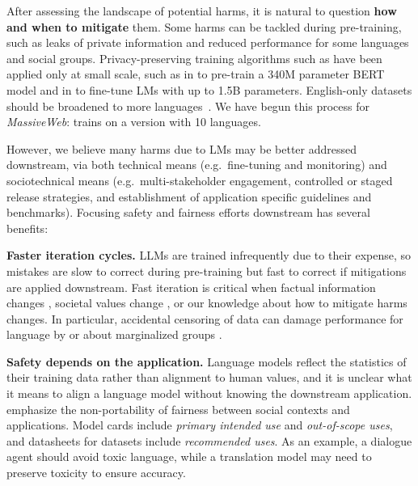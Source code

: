 \documentclass[11pt, a4paper, logo, internal, copyright, nonumbering]{deepmind}
\newcommand{\massiveweb}{\textit{MassiveWeb}\xspace}
\begin{document}
After assessing the landscape of potential harms, it is natural to question \textbf{how and when to mitigate} them. Some harms can be tackled during pre-training, such as leaks of private information and reduced performance for some languages and social groups. Privacy-preserving training algorithms such as \citet{abadi2016deep} have been applied only at small scale, such as in \cite{anil2021large} to pre-train a 340M parameter BERT model and in \citet{yu2021differentially} to fine-tune LMs with up to 1.5B parameters.
English-only datasets should be broadened to more languages~\citep{xue2020mt5}. We have begun this process for \massiveweb: \cite{borgeaud2021retrieval} trains on a version with 10 languages.

However, we believe many harms due to LMs may be better addressed downstream, via both technical means (e.g.\ fine-tuning and monitoring) and sociotechnical means (e.g.\ multi-stakeholder engagement, controlled or staged release strategies, and establishment of application specific guidelines and benchmarks).
Focusing safety and fairness efforts downstream has several benefits:

\textbf{Faster iteration cycles.} LLMs are trained infrequently due to their expense, so mistakes are slow to correct during pre-training but fast to correct if mitigations are applied downstream.  Fast iteration is critical when factual information changes \citep{lazaridou2021pitfalls}, societal values change \citep{weidinger2021harms}, or our knowledge about how to mitigate harms changes.  In particular, accidental censoring of data can damage performance for language by or about marginalized groups \citep{xu2021detoxifying,dodge2021documenting,welbl2021challenges}.

\textbf{Safety depends on the application.} Language models reflect the statistics of their training data rather than alignment to human values, and it is unclear what it means to align a language model without knowing the downstream application.  \citet{selbst2019fairness} emphasize the non-portability of fairness between social contexts and applications. Model cards \citep{mitchell2019model} include \textit{primary intended use} and \textit{out-of-scope uses}, and datasheets for datasets \citep{gebru2018datasheets} include \textit{recommended uses}.  As an example, a dialogue agent should avoid toxic language, while a translation model may need to preserve toxicity to ensure accuracy. 
    
\end{document}
